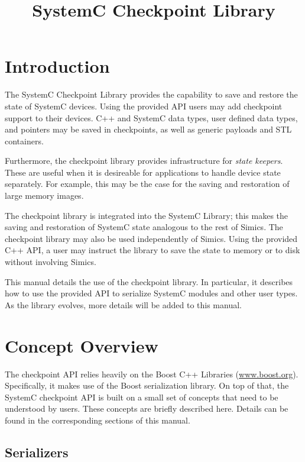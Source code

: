 \documentclass[oneside]{memoir}
\title{SystemC Checkpoint Library}
\begin{document}
\maketitle
\tableofcontents

\chapter{Introduction}
\label{introduction}

The SystemC Checkpoint Library provides the capability to save and restore the state of SystemC devices.
Using the provided API users may add checkpoint support to their devices.
C++ and SystemC data types, user defined data types, and pointers may be saved in checkpoints, as well as generic payloads and STL containers.

Furthermore, the checkpoint library provides infrastructure for \textit{state keepers}.
These are useful when it is desireable for applications to handle device state separately.
For example, this may be the case for the saving and restoration of large memory images.

The checkpoint library is integrated into the SystemC Library; this makes the saving and restoration of SystemC state analogous to the rest of Simics.
The checkpoint library may also be used independently of Simics.
Using the provided C++ API, a user may instruct the library to save the state to memory or to disk without involving Simics.

This manual details the use of the checkpoint library.
In particular, it describes how to use the provided API to serialize SystemC modules and other user types.
As the library evolves, more details will be added to this manual.

\chapter{Concept Overview}
\label{concept-overview}

The checkpoint API relies heavily on the Boost C++ Libraries (\url{www.boost.org}).
Specifically, it makes use of the Boost serialization library.
On top of that, the SystemC checkpoint API is built on a small set of concepts that need to be understood by users.
These concepts are briefly described here.
Details can be found in the corresponding sections of this manual.

\section{Serializers}
\label{overview-serializers}
\end{document}
